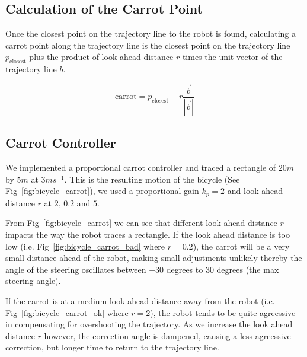 \documentclass{article}
\begin{document}
\newpage
\subsection{Calculation of the Carrot Point}
Once the closest point on the trajectory line to the robot is found, calculating a carrot point along the trajectory line is the closest point on the trajectory line $p_{\text{closest}}$ plus the product of look ahead distance $r$ times the unit vector of the trajectory line $b$.

\begin{equation}
	\text{carrot} = p_{\text{closest}} + r \dfrac{\vec{b}}{|\vec{b}|}
\end{equation}



\subsection{Carrot Controller}
We implemented a proportional carrot controller and traced a rectangle of $20m$ by $5m$ at $3ms^{-1}$. This is the resulting motion of the bicycle (See Fig~\ref{fig:bicycle_carrot}), we used a proportional gain $k_{p} = 2$ and look ahead distance $r$ at $2$, $0.2$ and $5$. 

From Fig~\ref{fig:bicycle_carrot} we can see that different look ahead distance $r$ impacts the way the robot traces a rectangle. If the look ahead distance is too low (i.e. Fig~\ref{fig:bicycle_carrot_bad} where $r = 0.2$), the carrot will be a very small distance ahead of the robot, making small adjustments unlikely thereby the angle of the steering oscillates between $-30$ degrees to $30$ degrees (the max steering angle).

If the carrot is at a medium look ahead distance away from the robot  (i.e. Fig~\ref{fig:bicycle_carrot_ok} where $r = 2$), the robot tends to be quite agreessive in compensating for overshooting the trajectory. As we increase the look ahead distance $r$ however, the correction angle is dampened, causing a less agreessive correction, but longer time to return to the trajectory line.
\end{document}
